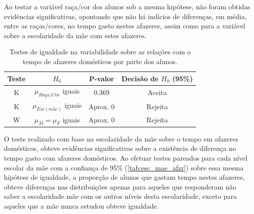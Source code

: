 Ao testar a variável raça/cor dos alunos sob a mesma hipótese, não foram obtidas evidências significativas,
apontando que não há indícios de diferenças, em média, entre as raças/cores, no tempo gasto
nestes afazeres, assim como para a variável sobre a escolaridade da mãe com estes afazeres.




\begin{table}[htb]
    \caption{Testes de igualdade na variabilidade sobre as relações 
            com o tempo de afazeres domésticos por parte dos alunos.\label{tab:af_test}}
        \centering
        \begin{tabular}{cccc}
        \toprule
        Teste & $H_0$& P-valor & Decisão de $H_0$ (95\%)\\
        \midrule \midrule
        K & $\mu_{Raça/Cor}$ iguais & 0.369 & Aceita\\
        K & $\mu_{Esc(mãe)}$ iguais & Aprox. 0 & Rejeita\\
        W & $\mu_M = \mu_F$ iguais & Aprox. 0 & Rejeita\\
        \bottomrule
        \end{tabular}
\end{table}



O teste realizado com base na escolaridade da mãe sobre o tempo em afazeres domésticos, obteve evidências significativas sobre a
existência de diferença no tempo gasto com afazeres domésticos. Ao efetuar testes pareados para cada 
nível escolar da mãe com a confiança de 95\% (\autoref{tab:esc_mae_afzr}) sobre essa mesma hipótese de igualdade, a proporção de alunos que gastam tempo nestes
afazeres, obteve diferenças nas distribuições apenas para aqueles que responderam não saber a escolaridade mãe com
os outros níveis desta escolaridade, exceto para aqueles que a mãe nunca estudou obteve igualdade.  
\clearpage

